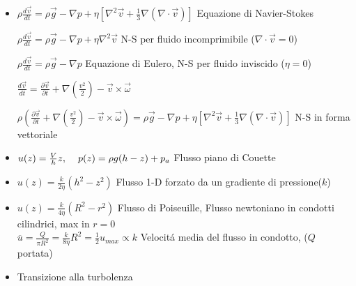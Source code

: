 \documentclass[a4paper]{article}
\begin{document}
\begin{itemize}
	$e_{ij}= \dot{\varepsilon_{ij}}= \frac{1}{2}(\frac{\partial v_i}{\partial x_j}+\frac{\partial v_j}{\partial x_i})$ Velocit\'a di deformazione\\
	$\tau_{ij}=-p \delta_{ij} + 2 \eta (e_{ij}-\frac{1}{3}e_{kk}\delta_{ij})$ Fluido newtoniano di viscosit\'a $\eta$
	
	\item $\rho \frac{d \overrightarrow{v}}{dt} = \rho \overrightarrow{g}- \nabla p + \eta[\nabla^2 \overrightarrow{v} + \frac{1}{3}\nabla(\nabla \cdot \overrightarrow{v})]$ \hspace{0.3cm} Equazione di Navier-Stokes
	
	$\rho \frac{d \overrightarrow{v}}{dt} = \rho \overrightarrow{g}- \nabla p + \eta\nabla^2 \overrightarrow{v}$ \hspace{0.3cm} N-S per fluido incomprimibile ($\nabla \cdot \overrightarrow{v}=0$)
	
	$\rho \frac{d \overrightarrow{v}}{dt} = \rho \overrightarrow{g}- \nabla p$ \hspace{0.3cm} Equazione di Eulero, N-S per fluido inviscido ($\eta = 0$)
	
	$\frac{d\overrightarrow{v}}{dt}=\frac{\partial \overrightarrow{v}}{\partial t}+\nabla (\frac{v^2}{2})-\overrightarrow{v} \times \overrightarrow{\omega}$
	
	$\rho  (\frac{\partial \overrightarrow{v}}{\partial t}+\nabla (\frac{v^2}{2})-\overrightarrow{v} \times \overrightarrow{\omega}) = \rho \overrightarrow{g}- \nabla p + \eta[\nabla^2 \overrightarrow{v} + \frac{1}{3}\nabla(\nabla \cdot \overrightarrow{v})]$ \hspace{0.3cm} N-S in forma vettoriale
	
	\item $u(z) = \frac{V}{h}z, \hspace{0.4cm} p(z)=\rho g (h-z)+p_a$ Flusso piano di Couette
	
	\item $u(z)=\frac{k}{2 \eta} (h^2-z^2) $ Flusso 1-D forzato da un gradiente di pressione($k$)
	
	\item $u(z)=\frac{k}{4 \eta} (R^2-r^2) $ Flusso di Poiseuille, Flusso newtoniano in condotti cilindrici, max in $r=0$\\
	$\overline{u}=\frac{Q}{\pi R^2}=\frac{k}{8\eta}R^2=\frac{1}{2}u_{max}\propto k$ Velocit\'a media del flusso in condotto, ($Q$ portata)
	
	\item Transizione alla turbolenza
	

\end{itemize}
\end{document}

